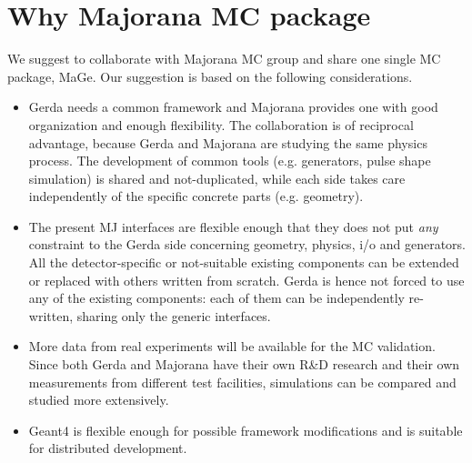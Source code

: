 \documentclass[a4paper,12pt,twoside]{article}
\begin{document}
\section{Why Majorana MC package}
\label{sec:why-majorana-mc-package}
We suggest to collaborate with Majorana MC group
and share one single MC package, MaGe. Our suggestion
is based on the following considerations.


\begin{itemize}
\item Gerda needs a common framework and Majorana provides one
with good organization and enough flexibility. The collaboration   
is of reciprocal advantage, because Gerda and Majorana
are studying the same physics process. The development of common 
tools (e.g. generators, pulse shape simulation) is shared and 
not-duplicated, while each side takes care independently 
of the specific concrete parts (e.g. geometry). 

\item The present MJ interfaces are flexible enough that they does not 
put \emph{any} constraint to the Gerda side concerning geometry, physics, 
i/o and generators. All the detector-specific or 
not-suitable existing components can be extended or replaced with others 
written from scratch. Gerda is hence not forced to use any of the 
existing components: each of them can be independently re-written, 
sharing only the generic interfaces. 

\item More data from
real experiments will be available for the MC validation. 
Since both Gerda and Majorana have their own R\&D research
and their own measurements from different test facilities,
simulations can be compared and studied more extensively.

\item Geant4 is flexible enough for possible framework modifications
and is suitable for distributed development.

\end{itemize}
\end{document}
